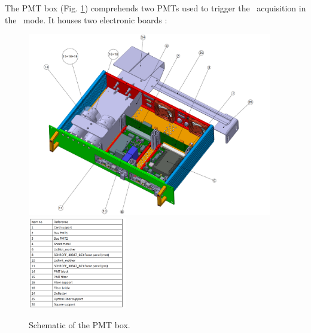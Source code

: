 The PMT box (Fig. \ref{fig:laspmtbox}) comprehends two PMTs \cite{ref:pmt} used to trigger the \lasii~acquisition in the \laser~mode. It houses two electronic boards :


\begin{figure}[htbp]
\centering
\includegraphics[height=8cm]{figures/pmtbox_meca.pdf}
\includegraphics[height=4cm]{figures/pmtbox_list.pdf}
\caption{Schematic of the PMT box.}\label{fig:laspmtbox}
\end{figure}

